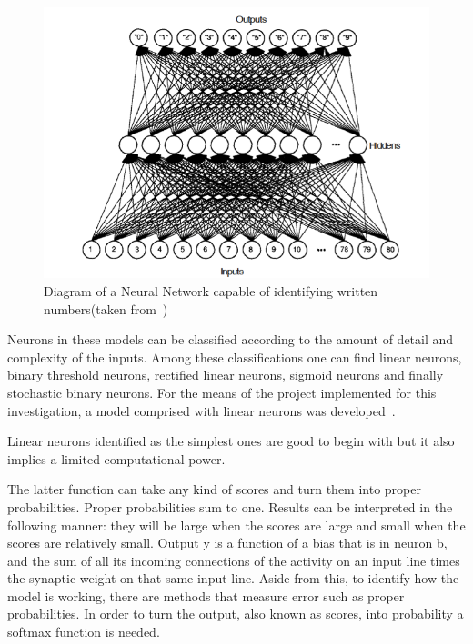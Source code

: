 \begin{figure}[htbp]
  \centering
  \includegraphics[width=\textwidth]{images/net}
  \caption{ Diagram of a Neural Network capable of identifying written numbers(taken from~\cite{freeman91}) }
  \label{fig:neuronNet}
\end{figure}

Neurons in these models can be classified according to the amount of detail and complexity of the inputs. Among these classifications one can find linear neurons, binary threshold neurons, rectified linear neurons, sigmoid neurons and finally stochastic binary neurons. For the means of the project implemented for this investigation, a model comprised with linear neurons was developed~\cite{hinton13}. 

Linear neurons identified as the simplest ones are good to begin with but it also implies a limited computational power.

The latter function can take any kind of scores and turn them into proper probabilities. Proper probabilities sum to one.  Results can be interpreted in the following manner: they will be large when the scores are large and small when the scores are relatively small. 
Output y is a function of a bias that is in neuron b, and the sum of all its incoming connections of the activity on an input line times the synaptic weight on that same input line. Aside from this, to identify how the model is working, there are methods that measure error such as proper probabilities. In order to turn the output, also known as scores, into probability a softmax function is needed.

